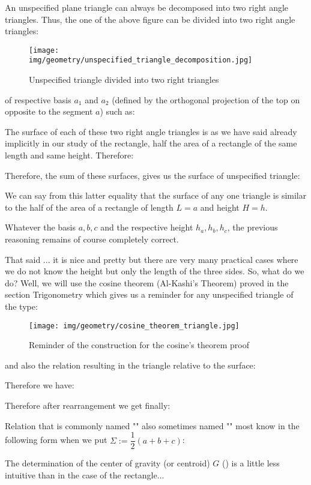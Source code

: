 {	An unspecified plane triangle can always be decomposed into two right angle triangles. Thus, the one of the above figure can be divided into two right angle triangles:
	\begin{figure}[H]
		\centering
		\texttt{[image: img/geometry/unspecified\_triangle\_decomposition.jpg]}
		\caption{Unspecified triangle divided into two right triangles}
	\end{figure}
	of respective basis $a_1$ and $a_2$ (defined by the orthogonal projection of the top on opposite to the segment $a$) such as:
	
	The surface of each of these two right angle triangles is as we have said already implicitly in our study of the rectangle, half the area of a rectangle of the same length and same height. Therefore:
	
	Therefore, the sum of these surfaces, gives us the surface of unspecified triangle:
	
	We can say from this latter equality that the surface of any one triangle is similar to the half of the area of a rectangle of length $L=a$ and height $H=h$.
	\begin{tcolorbox}[title=Remark,colframe=black,arc=10pt]
	Whatever the basis $a, b, c$ and the respective height $h_a,h_b,h_c$, the previous reasoning remains of course completely correct.
	\end{tcolorbox}
	That said ... it is nice and pretty but there are very many practical cases where we do not know the height but only the length of the three sides. So, what do we do? Well, we will use the cosine theorem (Al-Kashi's Theorem) proved in the section Trigonometry which gives us a reminder for any unspecified triangle of the type:
	\begin{figure}[H]
		\centering
		\texttt{[image: img/geometry/cosine\_theorem\_triangle.jpg]}
		\caption{Reminder of the construction for the cosine's theorem proof}
	\end{figure}
	
	and also the relation resulting in the triangle relative to the surface:
	
	Therefore we have:
	
	Therefore after rearrangement we get finally:
	
	Relation that is commonly named "" also sometimes named "" most know in the following form when we put $\Sigma:=\dfrac{1}{2}\left(a+b+c\right)$:
	
	
	The determination of the center of gravity (or centroid) $G$ () is a little less intuitive than in the case of the rectangle...
	
}
